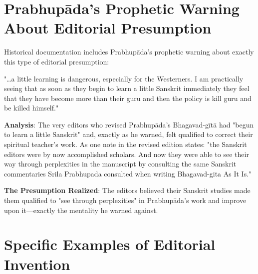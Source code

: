 \documentclass[11pt,twoside]{book}
\begin{document}
\section*{Prabhupāda's Prophetic Warning About Editorial Presumption}
\label{sec:org669ec39}

Historical documentation includes Prabhupāda's prophetic warning about exactly this type of editorial presumption:

"\ldots{}a little learning is dangerous, especially for the Westerners. I am practically seeing that as soon as they begin to learn a little Sanskrit immediately they feel that they have become more than their guru and then the policy is kill guru and be killed himself."

\textbf{\textbf{Analysis}}: The very editors who revised Prabhupāda's Bhagavad-gītā had "begun to learn a little Sanskrit" and, exactly as he warned, felt qualified to correct their spiritual teacher's work. As one note in the revised edition states: "the Sanskrit editors were by now accomplished scholars. And now they were able to see their way through perplexities in the manuscript by consulting the same Sanskrit commentaries Srila Prabhupada consulted when writing Bhagavad-gita As It Is."

\textbf{\textbf{The Presumption Realized}}: The editors believed their Sanskrit studies made them qualified to "see through perplexities" in Prabhupāda's work and improve upon it—exactly the mentality he warned against.
\section*{Specific Examples of Editorial Invention}
\label{sec:orgfb5c33e}
\end{document}
